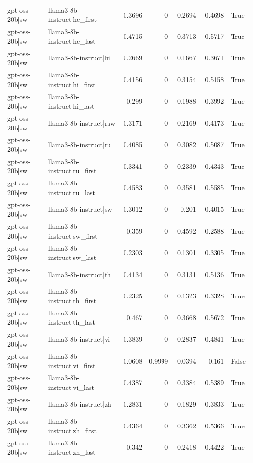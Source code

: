 \begin{table}
\begin{tabular}{l l r r r r l}
gpt-oss-20b|sw & llama3-8b-instruct|he_first & 0.3696 & 0 & 0.2694 & 0.4698 & True \\
gpt-oss-20b|sw & llama3-8b-instruct|he_last & 0.4715 & 0 & 0.3713 & 0.5717 & True \\
gpt-oss-20b|sw & llama3-8b-instruct|hi & 0.2669 & 0 & 0.1667 & 0.3671 & True \\
gpt-oss-20b|sw & llama3-8b-instruct|hi_first & 0.4156 & 0 & 0.3154 & 0.5158 & True \\
gpt-oss-20b|sw & llama3-8b-instruct|hi_last & 0.299 & 0 & 0.1988 & 0.3992 & True \\
gpt-oss-20b|sw & llama3-8b-instruct|raw & 0.3171 & 0 & 0.2169 & 0.4173 & True \\
gpt-oss-20b|sw & llama3-8b-instruct|ru & 0.4085 & 0 & 0.3082 & 0.5087 & True \\
gpt-oss-20b|sw & llama3-8b-instruct|ru_first & 0.3341 & 0 & 0.2339 & 0.4343 & True \\
gpt-oss-20b|sw & llama3-8b-instruct|ru_last & 0.4583 & 0 & 0.3581 & 0.5585 & True \\
gpt-oss-20b|sw & llama3-8b-instruct|sw & 0.3012 & 0 & 0.201 & 0.4015 & True \\
gpt-oss-20b|sw & llama3-8b-instruct|sw_first & -0.359 & 0 & -0.4592 & -0.2588 & True \\
gpt-oss-20b|sw & llama3-8b-instruct|sw_last & 0.2303 & 0 & 0.1301 & 0.3305 & True \\
gpt-oss-20b|sw & llama3-8b-instruct|th & 0.4134 & 0 & 0.3131 & 0.5136 & True \\
gpt-oss-20b|sw & llama3-8b-instruct|th_first & 0.2325 & 0 & 0.1323 & 0.3328 & True \\
gpt-oss-20b|sw & llama3-8b-instruct|th_last & 0.467 & 0 & 0.3668 & 0.5672 & True \\
gpt-oss-20b|sw & llama3-8b-instruct|vi & 0.3839 & 0 & 0.2837 & 0.4841 & True \\
gpt-oss-20b|sw & llama3-8b-instruct|vi_first & 0.0608 & 0.9999 & -0.0394 & 0.161 & False \\
gpt-oss-20b|sw & llama3-8b-instruct|vi_last & 0.4387 & 0 & 0.3384 & 0.5389 & True \\
gpt-oss-20b|sw & llama3-8b-instruct|zh & 0.2831 & 0 & 0.1829 & 0.3833 & True \\
gpt-oss-20b|sw & llama3-8b-instruct|zh_first & 0.4364 & 0 & 0.3362 & 0.5366 & True \\
gpt-oss-20b|sw & llama3-8b-instruct|zh_last & 0.342 & 0 & 0.2418 & 0.4422 & True \\

\end{tabular}
\end{table}
